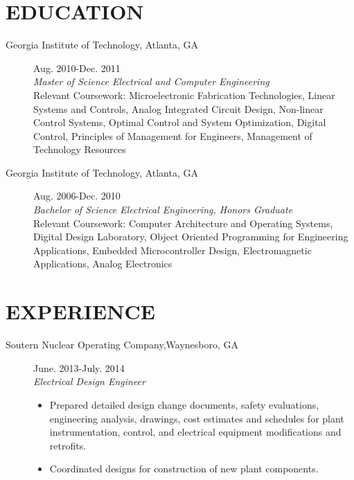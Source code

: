 \documentclass{res}
\begin{document}
\begin{resume}
\section{EDUCATION}
	\begin{description}
		\item[{Georgia Institute of Technology}, Atlanta, GA]\hfill Aug. 2010-Dec. 2011\\\textit{Master of Science Electrical and Computer Engineering}\\Relevant Coursework: Microelectronic Fabrication Technologies, Linear Systems and Controls, Analog Integrated Circuit Design, Non-linear Control Systems, Optimal Control and System Optimization, Digital Control, Principles of Management for Engineers, Management of Technology Resources
		\item[{Georgia Institute of Technology}, Atlanta, GA]\hfill Aug. 2006-Dec. 2010\\\textit{Bachelor of Science Electrical Engineering, Honors Graduate}\\Relevant Coursework: Computer Architecture and Operating Systems, Digital Design Laboratory, Object Oriented Programming for Engineering Applications, Embedded Microcontroller Design, Electromagnetic Applications, Analog Electronics
		
	\end{description}
\section{EXPERIENCE}
   	\begin{description}
   		\item[{Soutern Nuclear Operating Company},Waynesboro, GA]\hfill June. 2013-July. 2014\\\textit{Electrical Design Engineer}
   		\vspace{-0.1in} 
   		\begin{itemize}
   		   	\item Prepared detailed design change documents, safety evaluations, engineering analysis, drawings, cost estimates and schedules for plant instrumentation, control, and electrical equipment modifications and retrofits.
   		   	\item Coordinated designs for construction of new plant components. 
   		\end{itemize}
   		

\end{description}
\end{resume}
\end{document}
